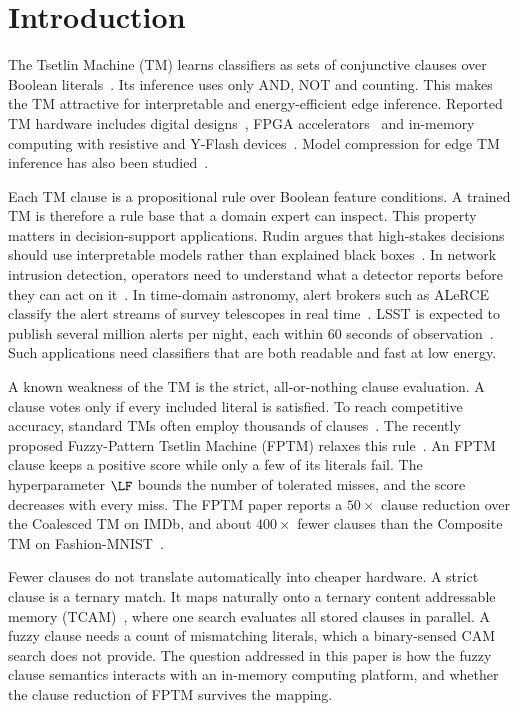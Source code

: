 \section{Introduction}\label{sec:intro}

The Tsetlin Machine (TM) learns classifiers as sets of conjunctive clauses over Boolean literals~\cite{granmo2018tsetlin}.
Its inference uses only AND, NOT and counting.
This makes the TM attractive for interpretable and energy-efficient edge inference.
Reported TM hardware includes digital designs~\cite{wheeldon2020learning}, FPGA accelerators~\cite{tunheim2025fpga} and in-memory computing with resistive and Y-Flash devices~\cite{ghazal2023imbue,ghazal2025impact}.
Model compression for edge TM inference has also been studied~\cite{maheshwari2023redress}.

Each TM clause is a propositional rule over Boolean feature conditions.
A trained TM is therefore a rule base that a domain expert can inspect.
This property matters in decision-support applications.
Rudin argues that high-stakes decisions should use interpretable models rather than explained black boxes~\cite{rudin2019stop}.
In network intrusion detection, operators need to understand what a detector reports before they can act on it~\cite{sommer2010outside}.
In time-domain astronomy, alert brokers such as ALeRCE classify the alert streams of survey telescopes in real time~\cite{forster2021alerce}.
LSST is expected to publish several million alerts per night, each within 60 seconds of observation~\cite{ivezic2019lsst}.
Such applications need classifiers that are both readable and fast at low energy.

A known weakness of the TM is the strict, all-or-nothing clause evaluation.
A clause votes only if every included literal is satisfied.
To reach competitive accuracy, standard TMs often employ thousands of clauses~\cite{hnilov2025fptm}.
The recently proposed Fuzzy-Pattern Tsetlin Machine (FPTM) relaxes this rule~\cite{hnilov2025fptm}.
An FPTM clause keeps a positive score while only a few of its literals fail. The hyperparameter $\LF$ bounds the number of tolerated misses, and the score decreases with every miss.
The FPTM paper reports a $50\times$ clause reduction over the Coalesced TM on IMDb, and about $400\times$ fewer clauses than the Composite TM on Fashion-MNIST~\cite{hnilov2025fptm}.

Fewer clauses do not translate automatically into cheaper hardware.
A strict clause is a ternary match. It maps naturally onto a ternary content addressable memory (TCAM)~\cite{pagiamtzis2006cam}, where one search evaluates all stored clauses in parallel.
A fuzzy clause needs a count of mismatching literals, which a binary-sensed CAM search does not provide.
The question addressed in this paper is how the fuzzy clause semantics interacts with an in-memory computing platform, and whether the clause reduction of FPTM survives the mapping.

